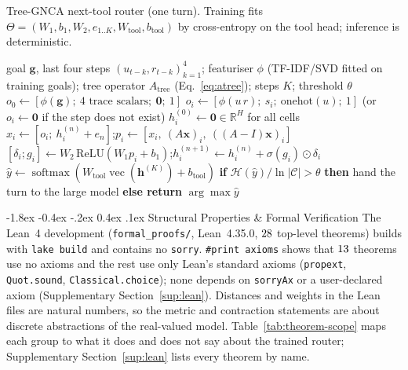 \documentclass[10pt,twocolumn,letterpaper]{article}
\makeatletter
\renewcommand\section{\@startsection {section}{1}{\z@}%
  {-1.8ex \@plus -0.4ex \@minus -.2ex}%
  {0.4ex \@plus.1ex}%
  {\normalfont\normalsize\bfseries}}
\makeatother
\begin{document}
\begin{algorithm}[t]
\caption{Tree-GNCA next-tool router (one turn). Training fits $\Theta=(W_1,b_1,W_2,e_{1..K},W_{\text{tool}},b_{\text{tool}})$ by cross-entropy on the tool head; inference is deterministic.}
\label{alg:router}
\small
\begin{algorithmic}[1]
\Require goal $\mathbf g$, last four steps $(u_{t-k},r_{t-k})_{k=1}^{4}$; featuriser $\phi$ (TF-IDF/SVD fitted on training goals); tree operator $A_{\text{tree}}$ (Eq.~\eqref{eq:atree}); steps $K$; threshold $\theta$
\State $o_0 \gets [\phi(\mathbf g);\ \text{4 trace scalars};\ \mathbf 0;\ 1]$ 
 
  \State $o_i \gets [\phi(u\,r);\ s_i;\ \mathrm{onehot}(u);\ 1]$ 
  \State \hspace{1em}(or $o_i \gets \mathbf 0$ if the step does not exist)
\EndFor
\State $h_i^{(0)} \gets \mathbf 0 \in\mathbb R^{H}$ for all cells
 
  \State $x_i \gets [o_i;\ h_i^{(n)}+e_n]$;\quad $p_i \gets [x_i,\ (A\mathbf x)_i,\ ((A-I)\mathbf x)_i]$
  \State $[\delta_i; g_i] \gets W_2\,\mathrm{ReLU}(W_1 p_i + b_1)$;\quad $h_i^{(n+1)} \gets h_i^{(n)} + \sigma(g_i)\odot\delta_i$
\EndFor
\State $\hat y \gets \operatorname{softmax}(W_{\text{tool}}\operatorname{vec}(\mathbf h^{(K)}) + b_{\text{tool}})$
\State \textbf{if} $\mathcal H(\hat y)/\ln|\mathcal C| > \theta$ \textbf{then} hand the turn to the large model \textbf{else return} $\arg\max \hat y$ 
\end{algorithmic}
\end{algorithm}

\section{Structural Properties \& Formal Verification}\label{sec:formal}
The Lean~4 development (\texttt{formal\_\allowbreak{}proofs/}, Lean~4.35.0, $28$ top-level theorems) builds with \texttt{lake build} and contains no \texttt{sorry}. \texttt{\#print axioms} shows that $13$ theorems use no axioms and the rest use only Lean's standard axioms (\texttt{propext}, \texttt{Quot.sound}, \texttt{Classical.choice}); none depends on \texttt{sorryAx} or a user-declared axiom (Supplementary Section~\ref{sup:lean}). Distances and weights in the Lean files are natural numbers, so the metric and contraction statements are about discrete abstractions of the real-valued model. Table~\ref{tab:theorem-scope} maps each group to what it does and does not say about the trained router; Supplementary Section~\ref{sup:lean} lists every theorem by name.
\end{document}
